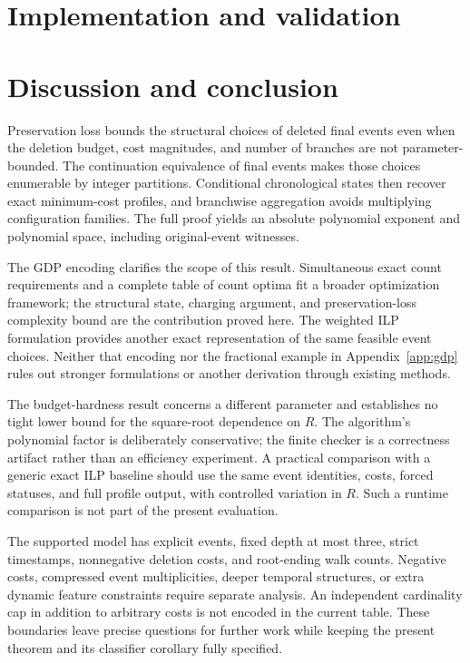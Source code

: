 \documentclass[11pt]{article}
\theoremstyle{remark}
\begin{document}
\section{Implementation and validation}\label{sec:validation}



\section{Discussion and conclusion}\label{sec:conclusion}

Preservation loss bounds the structural choices of deleted final events even
when the deletion budget, cost magnitudes, and number of branches are not
parameter-bounded. The continuation equivalence of final events makes those
choices enumerable by integer partitions. Conditional chronological states
then recover exact minimum-cost profiles, and branchwise aggregation avoids
multiplying configuration families. The full proof yields an absolute
polynomial exponent and polynomial space, including original-event witnesses.

The GDP encoding clarifies the scope of this result. Simultaneous exact
count requirements and a complete table of count optima fit a broader
optimization framework; the structural state, charging argument, and
preservation-loss complexity bound are the contribution proved here.
The weighted ILP formulation provides another exact representation of the
same feasible event choices. Neither that encoding nor the fractional
example in Appendix~\ref{app:gdp} rules out stronger formulations or
another derivation through existing methods.

The budget-hardness result concerns a different parameter and establishes no
tight lower bound for the square-root dependence on $R$. The algorithm's
polynomial factor is deliberately conservative; the finite checker is a
correctness artifact rather than an efficiency experiment. A practical
comparison with a generic exact ILP baseline should use the same event
identities, costs, forced statuses, and full profile output, with controlled
variation in $R$. Such a runtime comparison is not part of the present
evaluation.

The supported model has explicit events, fixed depth at most three, strict
timestamps, nonnegative deletion costs, and root-ending walk counts. Negative
costs, compressed event multiplicities, deeper temporal structures, or extra
dynamic feature constraints require separate analysis. An independent
cardinality cap in addition to arbitrary costs is not encoded in the current
table. These boundaries leave precise questions for further work while keeping
the present theorem and its classifier corollary fully specified.
\end{document}
